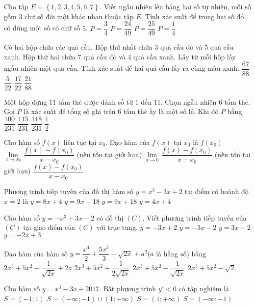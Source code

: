 \begin{ex}
Cho tập $E=\left\{ 1,2,3,4,5,6,7 \right\}$. Viết ngẫu nhiên lên bảng hai số tự nhiên, mỗi số gồm $3$ chữ số đôi một khác nhau thuộc tập $E$. Tính xác suất để trong hai số đó có đúng một số có chữ số $5$.
\choice
{$P=\dfrac{3}{4}$}
{$P=\dfrac{24}{49}$}
{$P=\dfrac{25}{49}$}
{$P=\dfrac{1}{4}$}
\end{ex}
\begin{ex}
Có hai hộp chứa các quả cầu. Hộp thứ nhất chứa $3$ quả cầu đỏ và $5$ quả cầu xanh. Hộp thứ hai chứa $7$ quả cầu đỏ và $4$ quả cầu xanh. Lấy từ mỗi hộp lấy ngẫu nhiên một quả cầu. Tính xác suất để hai quả cầu lấy ra cùng màu xanh.
\choice
{$\dfrac{67}{88}$}
{$\dfrac{5}{22}$}
{$\dfrac{17}{22}$}
{$\dfrac{21}{88}$}
\end{ex}
\begin{ex}
Một hộp đựng $11$ tấm thẻ được đánh số từ $1$ đến $11$. Chọn ngẫu nhiên $6$ tấm thẻ. Gọi $P$ là xác suất để tổng số ghi trên $6$ tấm thẻ ấy là một số lẻ. Khi đó $P$ bằng
\choice
{$\dfrac{100}{231}$}
{$\dfrac{115}{231}$}
{$\dfrac{118}{231}$}
{$\dfrac{1}{2}$}
\end{ex}
\begin{ex}
Cho hàm số $f(x)$ liên tục tại $x_0$. Đạo hàm của $f(x)$ tại $x_0$ là
\choice
{$f\left(x_0\right)$}
{$ \lim \limits_{x\to x_0} \,\dfrac{f(x)-f(x_0)}{x-x_0}$ (nếu tồn tại giới hạn)}
{$ \lim \limits_{x\to 0} \,\dfrac{f(x)-f(x_0)}{x-x_0}$ (nếu tồn tại giới hạn)}
{$\dfrac{f(x)-f(x_0)}{x-x_0}$}
\end{ex}
\begin{ex}
Phương trình tiếp tuyến của đồ thị hàm số $y=x^3-3x+2$ tại điểm có hoành độ $x=2$ là
\choice
{$y=8x+4$}
{$y=9x-18$}
{$y=9x+18$}
{$y=4x+4$}
\end{ex}
\begin{ex}
Cho hàm số $y=-x^3+3x-2$ có đồ thị $(C)$. Viết phương trình tiếp tuyến của $(C)$ tại giao điểm của $(C)$ với trục tung.
\choice
{$y=-3x+2$}
{$y=-3x-2$}
{$y=3x-2$}
{$y=-2x+3$}
\end{ex}
\begin{ex}
Đạo hàm của hàm số $y=\dfrac{x^4}{2}+\dfrac{5x^3}{3}-\sqrt{2x}+a^2$($a$ là hằng số) bằng
\choice
{$2x^3+5x^2-\dfrac{1}{\sqrt{2x}}+2a$}
{$2x^3+5x^2+\dfrac{1}{2\sqrt{2x}}$}
{$2x^3+5x^2-\dfrac{1}{\sqrt{2x}}$}
{$2x^3+5x^2-\sqrt{2}$}
\end{ex}
\begin{ex}
Cho hàm số $y=x^3-3x+2017$. Bất phương trình $y'<0$ có tập nghiệm là
\choice
{$S=(-1;1)$}
{$S=\left(-\infty ;-1\right)\cup \left(1;+\infty\right)$}
{$S=\left(1;+\infty\right)$}
{$S=\left(-\infty ;-1\right)$}
\end{ex}
